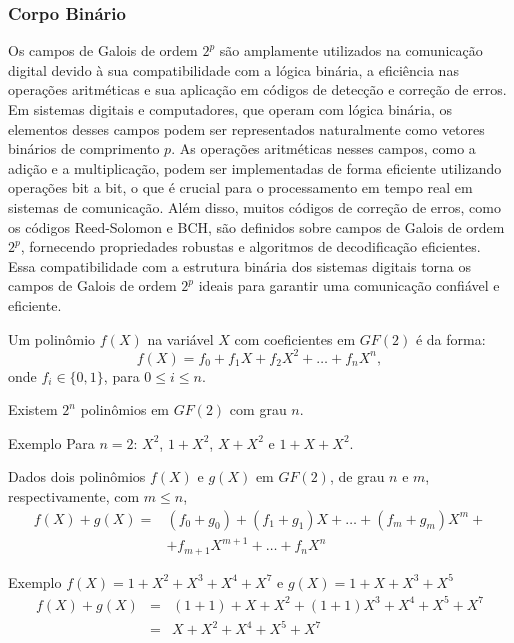 \begin{frame}[allowframebreaks]
  \frametitle{Corpo Binário} 
  Os campos de Galois de ordem $2^p$ são amplamente utilizados na comunicação
  digital devido à sua compatibilidade com a lógica binária, a eficiência nas
  operações aritméticas e sua aplicação em códigos de detecção e correção de
  erros. Em sistemas digitais e computadores, que operam com lógica binária, os
  elementos desses campos podem ser representados naturalmente como vetores
  binários de comprimento $p$. As operações aritméticas nesses campos, como a
  adição e a multiplicação, podem ser implementadas de forma eficiente
  utilizando operações bit a bit, o que é crucial para o processamento em tempo
  real em sistemas de comunicação. Além disso, muitos códigos de correção de
  erros, como os códigos Reed-Solomon e BCH, são definidos sobre campos de
  Galois de ordem $2^p$, fornecendo propriedades robustas e algoritmos de
  decodificação eficientes. Essa compatibilidade com a estrutura binária dos
  sistemas digitais torna os campos de Galois de ordem $2^p$ ideais para
  garantir uma comunicação confiável e eficiente.


  \framebreak

  Um polinômio $f(X)$ na variável $X$ com coeficientes em $GF(2)$ é da forma:
  \begin{equation}
    f(X) = f_0 + f_1 X + f_2 X^2 + \ldots + f_n X^n,
  \end{equation}
  onde $f_i \in \{0,1\}$, para $0 \leq i \leq n$.

  Existem $2^n$ polinômios em $GF(2)$ com grau $n$.
  \begin{block}{Exemplo}
  Para $n=2$: $X^2$, $1+X^2$, $X+X^2$ e $1+X+X^2$.
  \end{block}

  Dados dois polinômios $f(X)$ e $g(X)$ em $GF(2)$, de grau $n$ e $m$, respectivamente, com $m \leq n$,
  \begin{eqnarray}
    f(X) + g(X) =& (f_0 + g_0) + (f_1 + g_1) X + \ldots + (f_m + g_m) X^m + \nonumber\\
                  & + f_{m+1} X^{m+1} + \ldots + f_n X^n
  \end{eqnarray}
  \begin{block}{Exemplo}
    $f(X) = 1 + X^2 + X^3 + X^4 + X^7$ e $g(X) = 1 + X + X^3 + X^5$ 
    \begin{eqnarray}
      f(X) + g(X) &=& (1+1) + X + X^2 + (1+1) X^3 + X^4 + X^5 + X^7 \nonumber\\
                  &=& X + X^2 + X^4 + X^5 + X^7
    \end{eqnarray}
  \end{block}


\end{frame}
